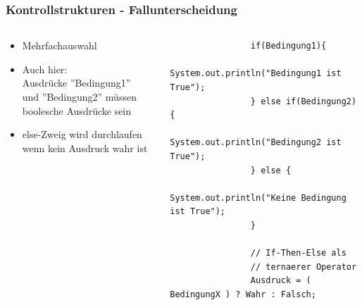 \begin{frame}[fragile]
	\frametitle{Kontrollstrukturen - Fallunterscheidung}
	\begin{columns}
		\begin{column}{0.5\textwidth}
			\small
			\begin{itemize}
			  \item Mehrfachauswahl
			  \item Auch hier: \\ 
			  Ausdr\"ucke ''Bedingung1'' \\
			  und ''Bedingung2'' m\"ussen boolesche Ausdr\"ucke sein\\
			  \item else-Zweig wird durchlaufen wenn kein Ausdruck wahr ist
			\end{itemize}
		\end{column}
		\begin{column}{0.5\textwidth}
			\begin{lstlisting}
				if(Bedingung1){
					System.out.println("Bedingung1 ist True");
				} else if(Bedingung2){
					System.out.println("Bedingung2 ist True");
				} else {
					System.out.println("Keine Bedingung ist True");
				}
				
				// If-Then-Else als 
				// ternaerer Operator
				Ausdruck = ( BedingungX ) ? Wahr : Falsch;
			\end{lstlisting}
		\end{column}
	\end{columns}
\end{frame}

